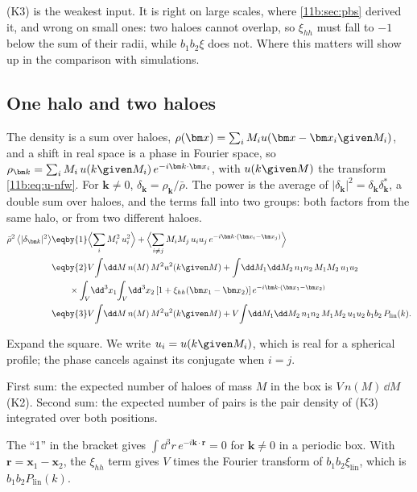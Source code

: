 (K3) is the weakest input. It is right on large scales, where
\cref{11b:sec:pbs} derived it, and wrong on small ones: two haloes cannot overlap,
so $\xi_{hh}$ must fall to $-1$ below the sum of their radii, while $b_1b_2\xi$ does
not. Where this matters will show up in the comparison with simulations.

\subsection{One halo and two haloes}
\label{11b:sec:p1h-p2h}

The density is a sum over haloes, $\rho(\bm x)=\sum_iM_iu(\bm x-\bm x_i\given M_i)$,
and a shift in real space is a phase in Fourier space, so
$\rho_{\bm k}=\sum_iM_i\,u(k\given M_i)\,e^{-i\bm k\cdot\bm x_i}$, with
$u(k\given M)$ the transform \eqref{11b:eq:u-nfw}. For $\bm k\neq0$,
$\delta_{\bm k}=\rho_{\bm k}/\bar\rho$. The power is the average of
$|\delta_{\bm k}|^2=\delta_{\bm k}\delta_{\bm k}^*$, a double sum over haloes, and
the terms fall into two groups: both factors from the same halo, or from two
different haloes.
\begin{align}
  \bar\rho^2\,\bigl\langle|\delta_{\bm k}|^2\bigr\rangle
  &\eqby{1}\Bigl\langle\sum_iM_i^2\,u_i^2\Bigr\rangle
   +\Bigl\langle\sum_{i\neq j}M_iM_j\,u_iu_j\,
     e^{-i\bm k\cdot(\bm x_i-\bm x_j)}\Bigr\rangle\nonumber\\
  &\eqby{2}V\!\int\!\dd M\,n(M)\,M^2u^2(k\given M)
   +\int\!\dd M_1\dd M_2\,n_1n_2\,M_1M_2\,u_1u_2\nonumber\\
  &\qquad\times\int_V\!\dd^3x_1\!\int_V\!\dd^3x_2\,[1+\xi_{hh}(\bm x_1-\bm x_2)]\,
     e^{-i\bm k\cdot(\bm x_1-\bm x_2)}\nonumber\\
  &\eqby{3}V\!\int\!\dd M\,n(M)\,M^2u^2(k\given M)
   +V\!\int\!\dd M_1\dd M_2\,n_1n_2\,M_1M_2\,u_1u_2\,b_1b_2\,P_{\mathrm{lin}}(k).
  \label{11b:eq:hm-derive}
\end{align}
\begin{explain}
  \item Expand the square. We write $u_i=u(k\given M_i)$, which is real for a
        spherical profile; the phase cancels against its conjugate when $i=j$.
  \item First sum: the expected number of haloes of mass $M$ in the box is
        $V\,n(M)\,\dd M$ (K2). Second sum: the expected number of pairs is the
        pair density of (K3) integrated over both positions.
  \item The ``1'' in the bracket gives $\int\dd^3r\,e^{-i\bm k\cdot\bm r}=0$
        for $\bm k\ne0$ in a periodic box. With $\bm r=\bm x_1-\bm x_2$, the
        $\xi_{hh}$ term gives $V$ times the Fourier transform of
        $b_1b_2\xi_{\mathrm{lin}}$, which is $b_1b_2P_{\mathrm{lin}}(k)$.
\end{explain}
